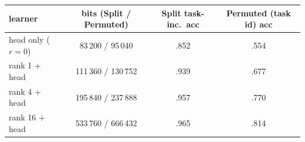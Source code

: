 \begin{tabular}{lccc}
\toprule
learner & bits (Split / Permuted) & Split task-inc.\ acc & Permuted (task id) acc \\
\midrule
head only ($r=0$) & 83\,200 / 95\,040 & .852 & .554 \\
rank 1 + head & 111\,360 / 130\,752 & .939 & .677 \\
rank 4 + head & 195\,840 / 237\,888 & .957 & .770 \\
rank 16 + head & 533\,760 / 666\,432 & .965 & .814 \\
\bottomrule
\end{tabular}
